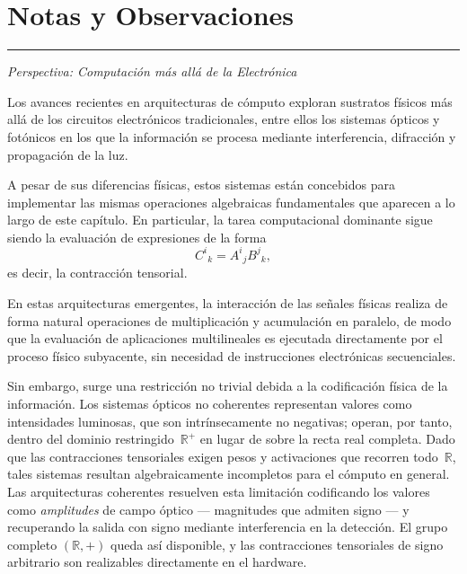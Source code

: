 
\section*{Notas y Observaciones}

\bigskip
\hrule
\medskip

\textit{Perspectiva: Computación más allá de la Electrónica \cite{Xu}}

\medskip

Los avances recientes en arquitecturas de cómputo exploran sustratos físicos
más allá de los circuitos electrónicos tradicionales, entre ellos los sistemas
ópticos y fotónicos en los que la información se procesa mediante
interferencia, difracción y propagación de la luz.

\medskip

A pesar de sus diferencias físicas, estos sistemas están concebidos para
implementar las mismas operaciones algebraicas fundamentales que aparecen a lo
largo de este capítulo.
En particular, la tarea computacional dominante sigue siendo la evaluación de
expresiones de la forma
\[
C^{i}{}_{k} = A^{i}{}_{j} B^{j}{}_{k},
\]
es decir, la contracción tensorial.

\medskip

En estas arquitecturas emergentes, la interacción de las señales físicas
realiza de forma natural operaciones de multiplicación y acumulación en
paralelo, de modo que la evaluación de aplicaciones multilineales es ejecutada
directamente por el proceso físico subyacente, sin necesidad de instrucciones
electrónicas secuenciales.

\medskip

Sin embargo, surge una restricción no trivial debida a la codificación física
de la información.
Los sistemas ópticos no coherentes representan valores como intensidades
luminosas, que son intrínsecamente no negativas; operan, por tanto, dentro del
dominio restringido~$\mathbb{R}^+$ en lugar de sobre la recta real completa.
Dado que las contracciones tensoriales exigen pesos y activaciones que recorren
todo~$\mathbb{R}$, tales sistemas resultan algebraicamente incompletos para el
cómputo en general.
Las arquitecturas coherentes resuelven esta limitación codificando los valores
como \emph{amplitudes} de campo óptico --- magnitudes que admiten signo --- y
recuperando la salida con signo mediante interferencia en la detección.
El grupo completo $(\mathbb{R},+)$ queda así disponible, y las contracciones
tensoriales de signo arbitrario son realizables directamente en el hardware.

